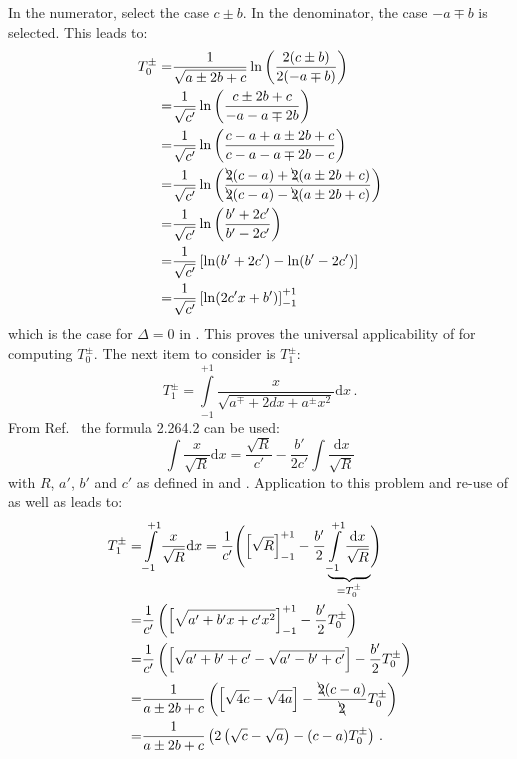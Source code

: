 In the numerator, select the case $c \pm b$.
In the denominator, the case $-a \mp b$ is selected.
This leads to:
\begin{align}
    T^{\pm}_0
 =& \frac{1}{\sqrt{a \pm 2 b + c}}
    \ln \left( \frac{ 2 (  c \pm b) }{ 2 ( -a \mp b) } \right) \nonumber \\
 =& \frac{1}{\sqrt{c'}}
    \ln \left( \frac{  c \pm 2b + c }{ -a -a \mp 2b } \right) \nonumber \\
 =& \frac{1}{\sqrt{c'}}
    \ln \left( \frac{c-a + a \pm 2b + c }{c-a - a \mp 2b - c } \right) \nonumber \\
 =& \frac{1}{\sqrt{c'}}
    \ln \left( \frac{\bcancel{2}(c-a) + \bcancel{2}(a \pm 2b + c)}{\bcancel{2}(c-a) - \bcancel{2}(a \pm 2b + c)} \right) \nonumber \\
 =& \frac{1}{\sqrt{c'}}
    \ln \left( \frac{b' + 2 c'}{b' - 2 c'} \right) \nonumber \\
 =& \frac{1}{\sqrt{c'}}
    \left[ \ln(b' + 2 c') - \ln(b' - 2 c') \right] \nonumber \\
 =& \frac{1}{\sqrt{c'}}
    \left[ \ln(2 c' x + b') \right]_{-1}^{+1}
\end{align}
which is the case for $\Delta=0$ in .
This proves the universal applicability of  for computing $T^{\pm}_0$.
The next item to consider is $T^{\pm}_1$:
\begin{equation}
 T^{\pm}_1 = \int\limits_{-1}^{+1} \frac{x}{\sqrt{a^{\mp} + 2 d x + a^{\pm} x^2}} \mathrm{d}x \, .
\end{equation}
From Ref.~\cite{gradshteyn_ryzhik} the formula 2.264.2 can be used:
\begin{equation}
   \int \frac{x}{\sqrt{R}} \mathrm{d}x
 = \frac{\sqrt{R}}{c'} - \frac{b'}{2 c'} \int \frac{\mathrm{d}x}{\sqrt{R}}
\end{equation}
with $R$, $a'$, $b'$ and $c'$ as defined in  and .
Application to this problem and re-use of  as well as  leads to:
\begin{align}
 T^{\pm}_1
 =& \int\limits_{-1}^{+1} \frac{x}{\sqrt{R}} \mathrm{d}x
  = \frac{1}{c'} \Biggl( \left[ \sqrt{R} \right]_{-1}^{+1} - \frac{b'}{2} \underbrace{\int\limits_{-1}^{+1} \frac{\mathrm{d}x}{\sqrt{R}}}_{=T^{\pm}_0} \Biggr) \nonumber \\
 =& \frac{1}{c'} \left( \left[ \sqrt{a' + b' x + c' x^2} \right]_{-1}^{+1} - \frac{b'}{2} T^{\pm}_0 \right) \nonumber \\
 =& \frac{1}{c'} \left( \left[ \sqrt{a' + b' + c'} - \sqrt{a' - b' + c'} \right] - \frac{b'}{2} T^{\pm}_0 \right) \nonumber \\
 =& \frac{1}{a \pm 2 b + c} \left( \left[ \sqrt{4 c} - \sqrt{4 a} \right] - \frac{\bcancel{2} (c-a)}{\bcancel{2}} T^{\pm}_0 \right) \nonumber \\
 =& \frac{1}{a \pm 2 b + c} \left( 2 \left(\sqrt{c} - \sqrt{a} \right) - (c-a) T^{\pm}_0 \right) \label{eqn:t_pm_1} \, .
\end{align}
